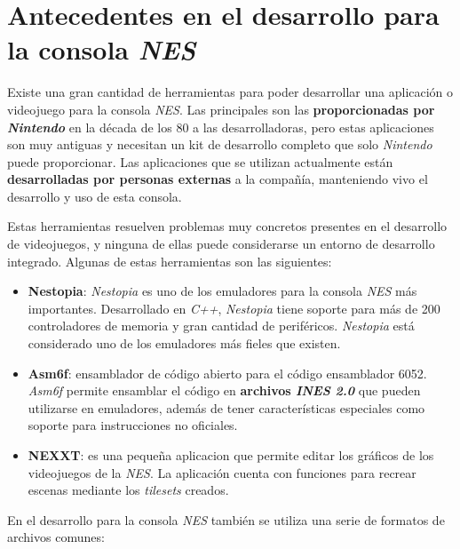 \section{Antecedentes en el desarrollo para la consola \textit{NES}}
\label{sec:antecedentes-en-el-desarrollo-para-la-consola-nes}

Existe una gran cantidad de herramientas para poder desarrollar
una aplicación o videojuego para la consola \textit{NES}\cite{NES}.
Las principales son las \textbf{proporcionadas por \textit{Nintendo}}
en la década de los 80 a las desarrolladoras, pero estas
aplicaciones son muy antiguas y necesitan un kit de desarrollo
completo que solo \textit{Nintendo} puede proporcionar.
Las aplicaciones que se utilizan actualmente están
\textbf{desarrolladas por personas externas} a la compañía,
manteniendo vivo el desarrollo y uso de esta consola.

Estas herramientas resuelven problemas muy concretos
presentes en el desarrollo de videojuegos, y ninguna
de ellas puede considerarse un entorno de desarrollo integrado.
Algunas de estas herramientas son las siguientes:

\begin{itemize}
    \item \textbf{Nestopia}\cite{NESTOPIA}:
    \textit{Nestopia} es uno de los emuladores
    para la consola \textit{NES} más importantes.
    Desarrollado en \textit{C++}, \textit{Nestopia} tiene soporte
    para más de 200 controladores de memoria y gran cantidad de periféricos.
    \emph{Nestopia} está considerado uno de los emuladores más
    fieles que existen.
    \item \textbf{Asm6f}\cite{ASM6F}:
    ensamblador de código abierto
    para el código ensamblador 6052.
    \textit{Asm6f} permite ensamblar el código en
    \textbf{archivos \textit{INES 2.0}}
    que pueden utilizarse en emuladores, además
    de tener características especiales como soporte
    para instrucciones no oficiales.
    \item \textbf{NEXXT}: es una pequeña
    aplicacion que permite editar los gráficos de los
    videojuegos de la \textit{NES}.
    La aplicación cuenta con funciones para recrear escenas
    mediante los \textit{tilesets} creados.
\end{itemize}

En el desarrollo para la consola \textit{NES} también se utiliza
una serie de formatos de archivos comunes:

